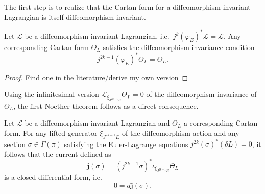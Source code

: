 The first step is to realize that the Cartan form for a diffeomorphism invariant Lagrangian is itself diffeomorphism invariant.
\begin{proposition}[\cite{}]\label{prop_cartan_diffeo}
  Let $\mathscr L$ be a diffeomorphism invariant Lagrangian, i.e.~$j^k(\varphi_E)^\ast \mathscr L=\mathscr L$. Any corresponding Cartan form $\Theta_L$ satisfies the diffeomorphism invariance condition
  \begin{equation}
    j^{2k-1}(\varphi_E)^\ast \Theta_L = \Theta_L.
  \end{equation}
\end{proposition}
\begin{proof}
  Find one in the literature/derive my own version
\end{proof}
Using the infinitesimal version $\mathcal L_{\xi_{J^{2k-1}E}} \Theta_L = 0$ of the diffeomorphism invariance of $\Theta_L$, the first Noether theorem follows as a direct consequence.
\begin{theorem}
  Let $\mathscr L$ be a diffeomorphism invariant Lagrangian and $\Theta_L$ a corresponding Cartan form. For any lifted generator $\xi_{J^{2k-1}E}$ of the diffeomorphism action and any section $\sigma\in\Gamma(\pi)$ satisfying the Euler-Lagrange equations $j^{2k}(\sigma)^\ast(\delta L)=0$, it follows that the current defined as
  \begin{equation}
    \boldsymbol{j}(\sigma) = (j^{2k-1}\sigma)^\ast \iota_{\xi_{J^{2k-1}E}} \Theta_L
  \end{equation}
  is a closed differential form, i.e.~
  \begin{equation}\label{first_noether_eq}
    0 = d \boldsymbol{j}(\sigma).
  \end{equation}
\end{theorem}
